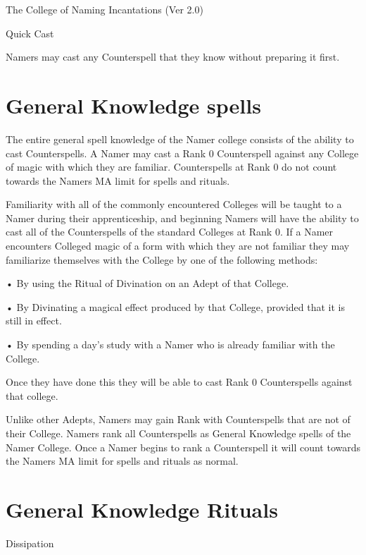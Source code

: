 \begin{Chapter}{The College of Naming Incantations (Ver 2.0)}
\begin{talent}[T-3]{Quick Cast}

\begin{effects}
Namers may cast any Counterspell that they know without preparing it
first.
\end{effects}
\end{talent}

\section{General Knowledge spells}

The entire general spell knowledge of the Namer college consists of
the ability to cast Counterspells.  A Namer may cast a Rank 0
Counterspell against any College of magic with which they are
familiar.  Counterspells at Rank 0 do not count towards the Namers MA
limit for spells and rituals.

Familiarity with all of the commonly encountered Colleges will be
taught to a Namer during their apprenticeship, and beginning Namers
will have the ability to cast all of the Counterspells of the standard
Colleges at Rank 0. If a Namer encounters Colleged magic of a form
with which they are not familiar they may familiarize themselves with
the College by one of the following methods:

• By using the Ritual of Divination on an Adept of that College.

• By Divinating a magical effect produced by that College, provided
that it is still in effect.

• By spending a day’s study with a Namer who is already familiar with
the College.

Once they have done this they will be able to cast Rank 0
Counterspells against that college.

Unlike other Adepts, Namers may gain Rank with Counterspells that are
not of their College. Namers rank all Counterspells as General
Knowledge spells of the Namer College.  Once a Namer begins to rank a
Counterspell it will count towards the Namers MA limit for spells and
rituals as normal.



\section{General Knowledge Rituals}


\begin{ritual}[Q-1]{Dissipation}



\end{ritual}
\end{Chapter}
